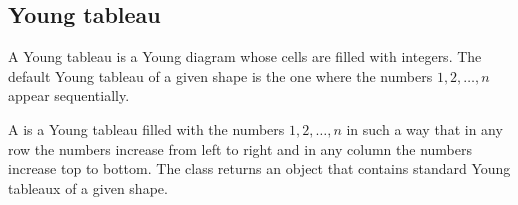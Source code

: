 \documentclass[letterpaper,10pt,english]{sphinxmanual}
\begin{document}
\subsection{Young tableau}
\label{\detokenize{index:young-tableau}}
\sphinxAtStartPar
A Young tableau is a Young diagram whose cells are filled with integers. The
default Young tableau of a given shape is the one where the numbers \(1,2,\ldots,n\)
appear sequentially.

\begin{sphinxVerbatim}[commandchars=\\\{\}]
\PYG{p}{[}\PYG{p}{]}
\end{sphinxVerbatim}

\sphinxAtStartPar
A  is a Young tableau filled with the numbers \(1,2,\ldots,n\)
in such a way that in any row the numbers increase from left to right and in any
column the numbers increase top to bottom.
The  class returns an object that contains  standard Young tableaux
of a given shape.

\begin{sphinxVerbatim}[commandchars=\\\{\}]
\PYG{p}{[}\PYG{p}{]}
   
    \PYG{p}{[}\PYG{p}{]}




\end{sphinxVerbatim}
\end{document}
